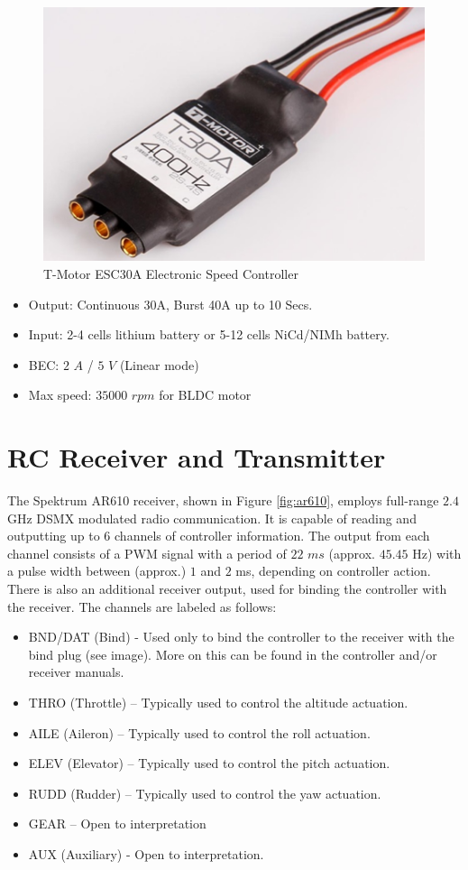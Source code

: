 \documentclass[a4paper]{report}
\begin{document}
\begin{figure}
    \centering
    \includegraphics[scale=0.8]{images/esc_tmotor.png}
    \caption{T-Motor ESC30A Electronic Speed Controller}
    \label{fig:esc_tmotor}
\end{figure}

\begin{itemize}
  \item Output: Continuous 30A, Burst 40A up to 10 Secs.
  \item Input: 2-4 cells lithium battery or 5-12 cells NiCd/NIMh battery.
  \item BEC: $2$ $A$ / $5$ $V$ (Linear mode)
  \item Max speed: $35000$ $rpm$ for BLDC motor
\end{itemize}

	\section{RC Receiver and Transmitter}

The Spektrum AR610 receiver, shown in Figure \ref{fig:ar610}, employs full-range $2.4$ GHz DSMX modulated radio communication. It is capable of reading and outputting up to 6 channels of controller information. The output from each channel consists of a PWM signal with a period of $22$ $ms$ (approx. $45.45$ Hz) with a pulse width between (approx.) $1$ and $2$ ms, depending on controller action. There is also an additional receiver output, used for binding the controller with the receiver. The channels are labeled as follows:

\begin{itemize}
  \item BND/DAT (Bind) - Used only to bind the controller to the receiver with the bind plug (see image). More on this can be found in the controller and/or receiver manuals.
  \item THRO (Throttle) – Typically used to control the altitude actuation.
  \item AILE (Aileron) – Typically used to control the roll actuation.
  \item ELEV (Elevator) – Typically used to control the pitch actuation.
  \item RUDD (Rudder) – Typically used to control the yaw actuation.
  \item GEAR – Open to interpretation
  \item AUX (Auxiliary) - Open to interpretation.
\end{itemize}
\end{document}
